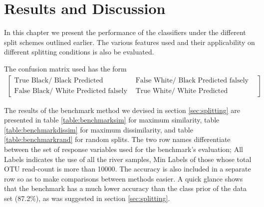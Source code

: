 \chapter{Results and Discussion}

\ifpdf
    \graphicspath{{Chapter3/Figs/Raster/}{Chapter3/Figs/PDF/}{Chapter3/Figs/}}
\else
    \graphicspath{{Chapter3/Figs/Vector/}{Chapter3/Figs/}}
\fi

In this chapter we present the performance of the classifiers under the different split schemes outlined earlier. The various features used and their applicability on different splitting conditions is also be evaluated. 

The confusion matrix used has the form 
\begin{align}
	\begin{bmatrix}
	\text{True Black/ Black Predicted correctly}&\text{False White/ Black  Predicted falsely}\\
	\text{False Black/ White Predicted falsely}&\text{True White/ White  Predicted correctly}
	\end{bmatrix}
\end{align}



The results of the benchmark method we devised in section \ref{sec:splitting} are presented in table \ref{table:benchmarksim} for maximum similarity, table \ref{table:benchmarkdissim} for maximum dissimilarity, and table \ref{table:benchmarkrand} for random splits. The two row names differentiate between the set of response variables used for the benchmark's evaluation; All Labels indicates the use of all the river samples, Min Labels of those whose total OTU read-count is more than 10000. The accuracy is also included in a separate row so as to make comparisons between methods easier. A quick glance shows that the benchmark has a much lower accuracy than the class prior of the data set (87.2\%), as was suggested in section \ref{sec:splitting}.



